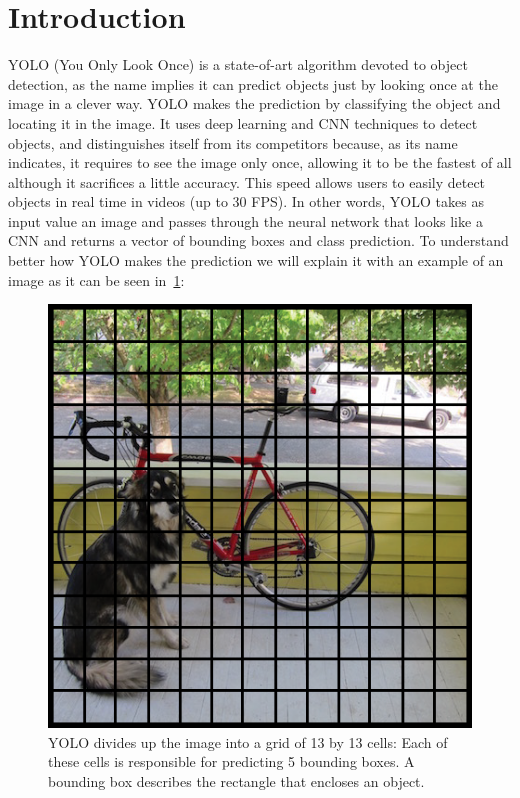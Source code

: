 \section{Introduction}
YOLO (You Only Look Once) is a state-of-art algorithm devoted to object detection, as the name implies it can predict objects just by looking once at the image in a clever way. YOLO makes the prediction by classifying the object and locating it in the image. It uses deep learning and CNN techniques to detect objects, and distinguishes itself from its competitors because, as its name indicates, it requires to see the image only once, allowing it to be the fastest of all although it sacrifices a little accuracy. This speed allows users to easily detect objects in real time in videos (up to 30 FPS). In other words, YOLO takes as input value an image and passes through the neural network that looks like a CNN and returns a vector of bounding boxes and class prediction. To understand better how YOLO makes the prediction we will explain it with an example of an image as it can be seen in~\ref{fig:yolo-grid}:
\newpage

\begin{figure}[h]
    \centering
    \includegraphics[max width=\textwidth]{images/ours/yolo-grid.png}
   \caption[Initial YOLO Bounding Boxes]{ YOLO divides up the image into a grid of 13 by 13 cells: Each of these cells is responsible for predicting 5 bounding boxes. A bounding box describes the rectangle that encloses an object. }
    \label{fig:yolo-grid}
\end{figure}



